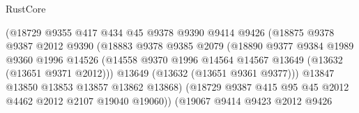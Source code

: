 \begin{lexlean}{RustCore}
\begin{coremodule}
                                  (@18729
                                    @9355
                                    @417
                                    @434
                                    @45
                                    @9378
                                    @9390
                                    @9414
                                    @9426
                                    (@18875
                                      @9378
                                      @9387
                                      @2012
                                      @9390
                                      (@18883
                                        @9378
                                        @9385
                                        @2079
                                        (@18890
                                          @9377
                                          @9384
                                          @1989
                                          @9360
                                          @1996
                                          @14526
                                          (@14558
                                            @9370
                                            @1996
                                            @14564
                                            @14567
                                            @13649
                                            (@13632 (@13651 @9371 @2012)))
                                          @13649
                                          (@13632 (@13651 @9361 @9377)))
                                        @13847
                                        @13850
                                        @13853
                                        @13857
                                        @13862
                                        @13868)
                                      (@18729
                                        @9387
                                        @415
                                        @95
                                        @45
                                        @2012
                                        @4462
                                        @2012
                                        @2107
                                        @19040
                                        @19060))
                                    (@19067
                                      @9414
                                      @9423
                                      @2012
                                      @9426

\end{coremodule}
\end{lexlean}
